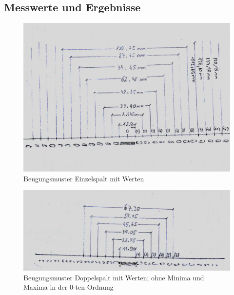 \documentclass[12pt,a4paper]{article}
\begin{document}
\begin{multicols}{2}
\subsection{Messwerte und Ergebnisse}



\end{multicols}
\begin{figure}[H]
	\centering
	\includegraphics[scale=0.9]{./figure/einzelspalt_beugung.png}
	\caption{Beugungsmuster Einzelspalt mit Werten}
	\label{fig:messwerte_einzelspalt}
\end{figure}
\begin{figure}[H]
	\centering
	\includegraphics[scale=0.9]{./figure/doppelspalt_beugung.png}
	\caption{Beugungsmuster Doppelspalt mit Werten; ohne Minima und Maxima in der 0-ten Ordnung}
	\label{fig:messwerte_doppelspalt}
\end{figure}
\end{document}
